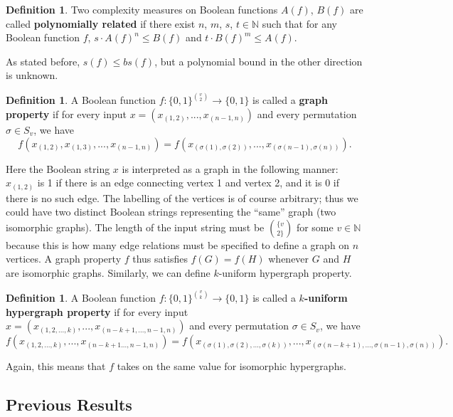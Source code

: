 \documentclass[psamsfonts]{amsart}
\theoremstyle{definition}
\newtheorem{defn}[theorem]{Definition}
\theoremstyle{remark}
\numberwithin{equation}{section}
\begin{document}
\begin{defn}
Two complexity measures on Boolean functions $A(f)$, $B(f)$ are called \textbf{polynomially related} if there exist $n$, $m$, $s$, $t \in \mathbb{N}$ such that 
for any Boolean function $f$, $s \cdot A(f)^{n} \leq B(f)$ and $t \cdot B(f)^{m} \leq A(f)$.  
\end{defn}

As stated before, $s(f) \leq bs(f)$, but a polynomial bound in the other direction is unknown.  

		\begin{defn}
	A Boolean function $f: \{0,1\}^{v \choose{2}} \to \{0,1\}$ is called a \textbf{graph property} if for every input $x = (x_{(1,2)},...,x_{(n-1,n)})$ and every permutation $\sigma \in S_v$, we have
			\begin{equation}
				f(x_{(1,2)},x_{(1,3)},...,x_{(n-1,n)}) = f(x_{(\sigma (1), \sigma (2))},...,x_{(\sigma (n-1), \sigma (n))}). \nonumber
			\end{equation}
		\end{defn}
Here the Boolean string $x$ is interpreted as a graph in the following manner: $x_{(1,2)}$ is 1 if there is an edge connecting vertex 1 and vertex 2, and it is 0 if there is no such edge.  
The labelling of the vertices is of course arbitrary; thus we could have two distinct Boolean strings representing the ``same'' graph (two isomorphic graphs).  The length of the input string 
must be $\{v \choose{2}\}$ for some $v \in \mathbb{N}$ because this is how many edge relations must be specified to define a graph on $n$ vertices.  A graph property $f$ thus satisfies $f(G) = f(H)$ whenever $G$ and $H$ are isomorphic graphs.	Similarly, we can define $k$-uniform hypergraph property.
			\begin{defn}
				A Boolean function $f: \{0,1\}^{v \choose{k}} \to \{0,1\}$ is called a \textbf{$k$-uniform hypergraph property} if for every input $x = (x_{(1,2,...,k)},...,x_{(n-k+1,...,n-1,n)})$ and every permutation $\sigma \in S_v$, we have
			\begin{equation}
				f(x_{(1,2,...,k)},...,x_{(n-k+1...,n-1,n)}) = f(x_{(\sigma (1), \sigma (2),..., \sigma(k))},...,x_{(\sigma (n-k+1),...,\sigma (n-1), \sigma (n))}). \nonumber
			\end{equation}
			\end{defn}
Again, this means that $f$ takes on the same value for isomorphic hypergraphs.

	\subsection{Previous Results}
\end{document}
